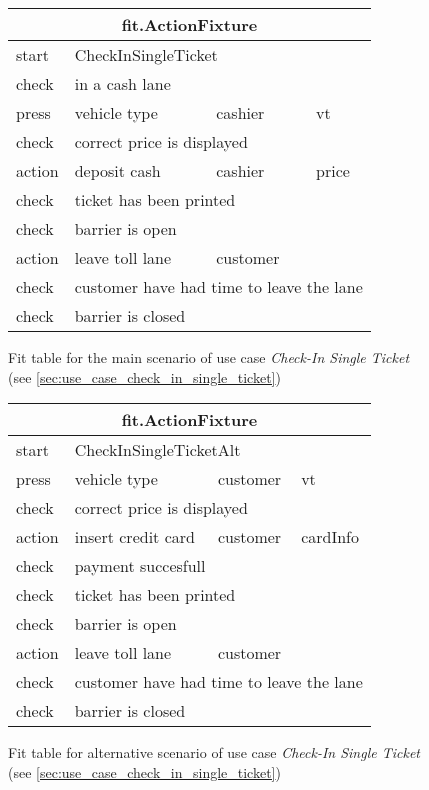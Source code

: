\begin{figure}[H]
\centering
\begin{tabular}{|l|l|l|l|}
\hline 
\multicolumn{4}{|c|}{fit.ActionFixture}\tabularnewline
\hline
start & \multicolumn{3}{|l|}{CheckInSingleTicket}\tabularnewline 
\hline
check & \multicolumn{3}{|l|}{in a cash lane} \tabularnewline
\hline 
press & vehicle type & cashier & vt \tabularnewline
\hline 
check & \multicolumn{3}{|l|}{correct price is displayed} \tabularnewline
\hline 
action & deposit cash & cashier & price \tabularnewline
\hline 
check & \multicolumn{3}{|l|}{ticket has been printed} \tabularnewline
\hline 
check & \multicolumn{3}{|l|}{barrier is open} \tabularnewline
\hline 
action & leave toll lane & customer & \tabularnewline
\hline 
check & \multicolumn{3}{|l|}{customer have had time to leave the lane} \tabularnewline
\hline
check & \multicolumn{3}{|l|}{barrier is closed} \tabularnewline
\hline 
\end{tabular}
\caption{Fit table for the main scenario of use case \emph{Check-In Single Ticket} (see \autoref{sec:use_case_check_in_single_ticket})}
\end{figure}

\begin{figure}[H]
\centering
\begin{tabular}{|l|l|l|l|}
\hline 
\multicolumn{4}{|c|}{fit.ActionFixture}\tabularnewline
\hline 
start & \multicolumn{3}{|l|}{CheckInSingleTicketAlt} \tabularnewline
\hline 
press & vehicle type & customer & vt \tabularnewline
\hline 
check & \multicolumn{3}{|l|}{correct price is displayed} \tabularnewline
\hline 
action & insert credit card & customer & cardInfo \tabularnewline
\hline 
check & \multicolumn{3}{|l|}{payment succesfull} \tabularnewline
\hline 
check & \multicolumn{3}{|l|}{ticket has been printed} \tabularnewline
\hline 
check & \multicolumn{3}{|l|}{barrier is open} \tabularnewline
\hline 
action & leave toll lane & customer & \tabularnewline
\hline 
check & \multicolumn{3}{|l|}{customer have had time to leave the lane} \tabularnewline
\hline
check & \multicolumn{3}{|l|}{barrier is closed} \tabularnewline
\hline 
\end{tabular}
\caption{Fit table for alternative scenario of use case \emph{Check-In Single Ticket} (see \autoref{sec:use_case_check_in_single_ticket})}
\end{figure}
